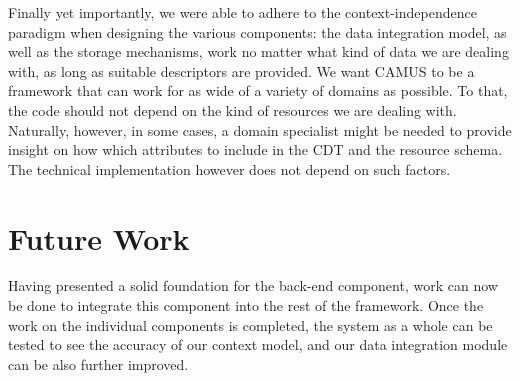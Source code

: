 Finally yet importantly, we were able to adhere to the context-independence paradigm when designing the various components: the data integration model, as well as the storage mechanisms, work no matter what kind of data we are dealing with, as long as suitable descriptors are provided. We want CAMUS to be a framework that can work for as wide of a variety of domains as possible. To that, the code should not depend on the kind of resources we are dealing with. Naturally, however, in some cases, a domain specialist might be needed to provide insight on how which attributes to include in the CDT and the resource schema. The technical implementation however does not depend on such factors.
\section{Future Work}
Having presented a solid foundation for the back-end component, work can now be done to integrate this component into the rest of the framework. Once the work on the individual components is completed, the system as a whole can be tested to see the accuracy of our context model, and our data integration module can be also further improved.